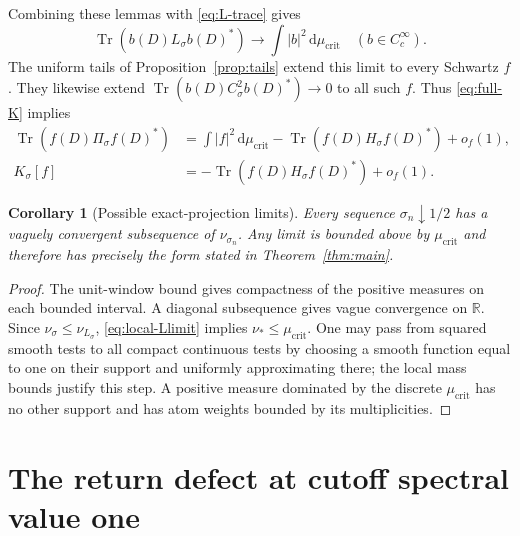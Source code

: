 \documentclass[11pt]{article}
\numberwithin{equation}{section}
\newtheorem{corollary}[theorem]{Corollary}
\theoremstyle{definition}
\theoremstyle{remark}
\newcommand{\Tr}{\operatorname{Tr}}
\newcommand{\dd}{\,\mathrm d}
\newcommand{\mucrit}{\mu_{\mathrm{crit}}}
\begin{document}
Combining these lemmas with \eqref{eq:L-trace} gives
\begin{equation}\label{eq:local-Llimit}
\Tr(b(D)L_\sigma b(D)^*)\longrightarrow
\int|b|^2\dd\mucrit
\quad (b\in C_c^\infty).
\end{equation}
The uniform tails of Proposition~\ref{prop:tails} extend this
limit to every Schwartz \(f\). They likewise extend
\(\Tr(b(D)C_\sigma^2b(D)^*)\to0\) to all such \(f\).
Thus \eqref{eq:full-K} implies
\begin{align}
\Tr(f(D)\Pi_\sigma f(D)^*)
&=\int|f|^2\dd\mucrit-\Tr(f(D)H_\sigma f(D)^*)+o_f(1),
\label{eq:deficit}\\
K_\sigma[f]&=-\Tr(f(D)H_\sigma f(D)^*)+o_f(1).
\label{eq:Kdeficit}
\end{align}

\begin{corollary}[Possible exact-projection limits]\label{cor:subseq}
Every sequence \(\sigma_n\downarrow1/2\) has a vaguely convergent
subsequence of \(\nu_{\sigma_n}\). Any limit is bounded above by
\(\mucrit\) and therefore has precisely the form stated in
Theorem~\ref{thm:main}.
\end{corollary}
\begin{proof}
The unit-window bound gives compactness of the positive measures
on each bounded interval. A diagonal subsequence gives vague
convergence on \(\mathbb R\). Since
\(\nu_{\sigma}\le\nu_{L_\sigma}\), \eqref{eq:local-Llimit}
implies \(\nu_*\le\mucrit\).
One may pass from squared smooth tests to all compact continuous
tests by choosing a smooth function equal to one on their support
and uniformly approximating there; the local mass bounds justify
this step. A positive measure dominated by the discrete
\(\mucrit\) has no other support and has atom weights bounded
by its multiplicities.
\end{proof}

\section{The return defect at cutoff spectral value one}\label{sec:return}
\end{document}
